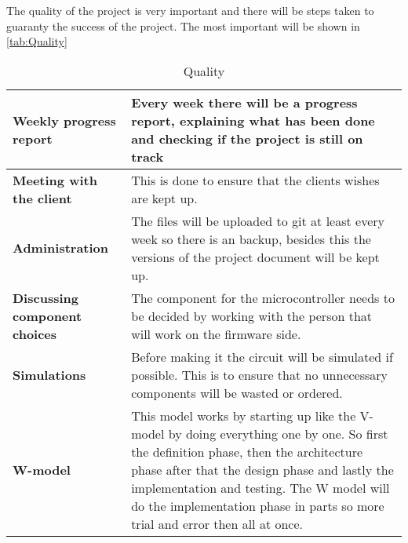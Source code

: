 The quality of the project is very important and there will be steps taken to guaranty the success of the project. The most important will be shown in \autoref{tab:Quality}

\begin{table}[H]
    \centering
    \begin{tabular}{l|p{8cm}}
        \bf Weekly progress report & Every week there will be a progress report, explaining what has been done and checking if the project is still on track \\\hline
        \bf Meeting with the client & This is done to ensure that the clients wishes are kept up.\\\hline
        \bf  Administration & The files will be uploaded to git at least every week so there is an backup, besides this the versions of the project document will be kept up. \\\hline
        \bf Discussing component choices & The component for the microcontroller needs to be decided by working with the person that will work on the firmware side. \\\hline
        \bf Simulations & Before making it the circuit will be simulated if possible. This is to ensure that no unnecessary components will be wasted or ordered. \\\hline
        \bf W-model & This model works by starting up like the V-model by doing everything one by one. So first the definition phase, then the architecture phase after that the design phase and lastly the implementation and testing. The W model will do the implementation phase in parts so more trial and error then all at once.\\
    \end{tabular}
    \caption{Quality}
    \label{tab:Quality}
\end{table}
